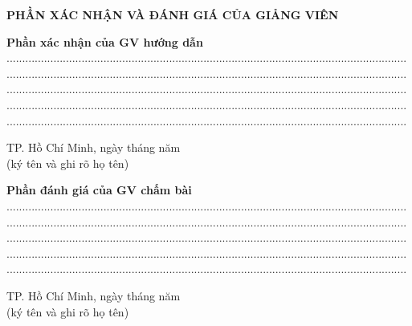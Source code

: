 \documentclass{article}
\begin{document}
\begin{center}
	\fontsize{16}{20}\selectfont
	\textbf{PHẦN XÁC NHẬN VÀ ĐÁNH GIÁ CỦA GIẢNG VIÊN}\\
\end{center}
\fontsize{13}{13}\selectfont
\textbf{Phần xác nhận của GV hướng dẫn}\\
................................................................................................................................\\
................................................................................................................................\\
................................................................................................................................\\
................................................................................................................................\\
................................................................................................................................\\
\begin{flushright}
	TP. Hồ Chí Minh,  ngày   tháng   năm   \\ 
	(ký tên và ghi rõ họ tên)\\
	\vspace{3cm}
\end{flushright}
\fontsize{13}{13}\selectfont
\textbf{Phần đánh giá của GV chấm bài}\\
................................................................................................................................\\
................................................................................................................................\\
................................................................................................................................\\
................................................................................................................................\\
................................................................................................................................\\
\begin{flushright}
	TP. Hồ Chí Minh,  ngày   tháng   năm   \\ 
	(ký tên và ghi rõ họ tên)\\
	\vspace{3cm}
\end{flushright}
\pagebreak
\end{document}
